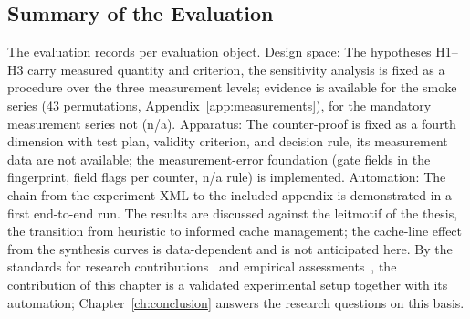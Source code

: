 \begin{nurkurz}
\subsection{Summary of the Evaluation}\label{sec:eval-summary}
The evaluation records per evaluation object. Design space: The hypotheses H1--H3 carry measured quantity
and criterion, the sensitivity analysis is fixed as a procedure over the three measurement levels; evidence
is available for the smoke series (43 permutations, Appendix~\ref{app:measurements}), for the mandatory
measurement series not (n/a). Apparatus: The counter-proof is fixed as a fourth dimension with test plan,
validity criterion, and decision rule, its measurement data are not available; the measurement-error
foundation (gate fields in the fingerprint, field flags per counter, n/a rule) is implemented. Automation:
The chain from the experiment XML to the included appendix is demonstrated in a first end-to-end run. The
results are discussed against the leitmotif of the thesis, the transition from heuristic to informed cache
management; the cache-line effect from the synthesis curves is data-dependent and is not anticipated here.
By the standards for research contributions~\cite{shaw2003writing} and empirical
assessments~\cite{blackburn2016truth}, the contribution of this chapter is a validated experimental setup
together with its automation; Chapter~\ref{ch:conclusion} answers the research questions on this basis.
\end{nurkurz}
